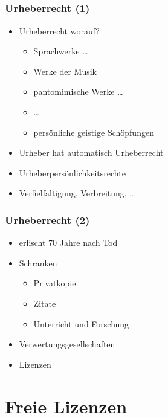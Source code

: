 \documentclass[table]{beamer}
\begin{document}
\subsection{}

\begin{frame}
  \frametitle{Urheberrecht (1)}
    \begin{itemize}
        \item<2-> Urheberrecht worauf?
        \begin{itemize}
          \item<3-> Sprachwerke \dots
          \item<4-> Werke der Musik
          \item<5-> pantomimische Werke \dots
          \item<6-> \dots
          \item<7-> persönliche geistige Schöpfungen
        \end{itemize}
      \item<8-> Urheber hat automatisch Urheberrecht
      \item<9-> Urheberpersönlichkeitsrechte
      \item<10-> Verfielfältigung, Verbreitung, \dots
    \end{itemize}
\end{frame}

\begin{frame}
  \frametitle{Urheberrecht (2)}
    \begin{itemize}
        \item<2-> erlischt 70 Jahre nach Tod
        \item<3-> Schranken
        \begin{itemize}
          \item<4-> Privatkopie
          \item<5-> Zitate
          \item<6-> Unterricht und Forschung
        \end{itemize}
        \item<7-> Verwertungsgesellschaften
        \item<8-> Lizenzen
    \end{itemize}
\end{frame}

\section{Freie Lizenzen}
\subsection{}
\end{document}
